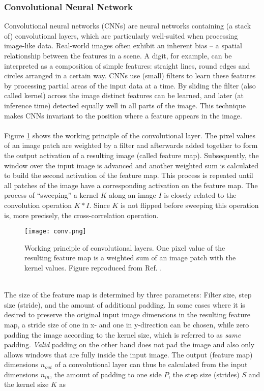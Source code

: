 \documentclass[../../main.tex]{subfiles}
\begin{document}
\subsubsection{Convolutional Neural Network}\label{sec:cnn}
Convolutional neural networks (CNNs) are neural networks containing (a stack of) convolutional layers, which are particularly well-suited when processing image-like data. Real-world images often exhibit an inherent bias -- a spatial relationship between the features in a scene. A digit, for example, can be interpreted as a composition of simple features: straight lines, round edges and circles arranged in a certain way. CNNs use (small) filters to learn these features by processing partial areas of the input data at a time. By sliding the filter (also called kernel) across the image distinct features can be learned, and later (at inference time) detected equally well in all parts of the image. This technique makes CNNs invariant to the position where a feature appears in the image.\\
\\
Figure \ref{fig:conv} shows the working principle of the convolutional layer. The pixel values of an image patch are weighted by a filter and afterwards added together to form the output activation of a resulting image (called feature map). Subsequently, the window over the input image is advanced and another weighted sum is calculated to build the second activation of the feature map. This process is repeated until all patches of the image have a corresponding activation on the feature map. The process of ``sweeping'' a kernel $K$ along an image $I$ is closely related to the convolution operation $K*I$. Since $K$ is not flipped before sweeping this operation is, more precisely, the cross-correlation operation.\\
\begin{figure}[htp]
	\begin{center}
		\texttt{[image: conv.png]}
		\caption{Working principle of convolutional layers. One pixel value of the resulting feature map is a weighted sum of an image patch with the kernel values. Figure reproduced from Ref. \cite{convBlock}.}
		\label{fig:conv}
	\end{center}
\end{figure}
\\
The size of the feature map is determined by three parameters: Filter size, step size (stride), and the amount of additional padding. In some cases where it is desired to preserve the original input image dimensions in the resulting feature map, a stride size of one in x- and one in y-direction can be chosen, while zero padding the image according to the kernel size, which is referred to as \textit{same} padding. \textit{Valid} padding on the other hand does not pad the image and also only allows windows that are fully inside the input image. The output (feature map) dimensions $n_{out}$ of a convolutional layer can thus be calculated from the input dimensions $n_{in}$, the amount of padding to one side $P$, the step size (strides) $S$ and the kernel size $K$ as
\end{document}
